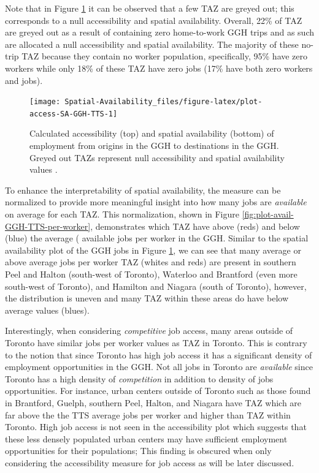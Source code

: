 \documentclass[]{elsarticle} %
\begin{document}
Note that in Figure \ref{fig:plot-access-SA-GGH-TTS} it can be observed
that a few TAZ are greyed out; this corresponds to a null accessibility
and spatial availability. Overall, 22\% of TAZ are greyed out as a
result of containing zero home-to-work GGH trips and as such are
allocated a null accessibility and spatial availability. The majority of
these no-trip TAZ because they contain no worker population,
specifically, 95\% have zero workers while only 18\% of these TAZ have
zero jobs (17\% have both zero workers and jobs).

\begin{figure}
\texttt{[image: Spatial-Availability\_files/figure-latex/plot-access-SA-GGH-TTS-1]} \caption{\label{fig:plot-access-SA-GGH-TTS}Calculated accessibility (top) and spatial availability (bottom) of employment from origins in the GGH to destinations in the GGH. Greyed out TAZs represent null accessibility and spatial availability values .}\label{fig:plot-access-SA-GGH-TTS}
\end{figure}

\newpage

To enhance the interpretability of spatial availability, the measure can
be normalized to provide more meaningful insight into how many jobs are
\emph{available} on average for each TAZ. This normalization, shown in
Figure \ref{fig:plot-avail-GGH-TTS-per-worker}, demonstrates which TAZ
have above (reds) and below (blue) the average ( available jobs per
worker in the GGH. Similar to the spatial availability plot of the GGH
jobs in Figure \ref{fig:plot-access-SA-GGH-TTS}, we can see that many
average or above average jobs per worker TAZ (whites and reds) are
present in southern Peel and Halton (south-west of Toronto), Waterloo
and Brantford (even more south-west of Toronto), and Hamilton and
Niagara (south of Toronto), however, the distribution is uneven and many
TAZ within these areas do have below average values (blues).

Interestingly, when considering \emph{competitive} job access, many
areas outside of Toronto have similar jobs per worker values as TAZ in
Toronto. This is contrary to the notion that since Toronto has high job
access it has a significant density of employment opportunities in the
GGH. Not all jobs in Toronto are \emph{available} since Toronto has a
high density of \emph{competition} in addition to density of jobs
opportunities. For instance, urban centers outside of Toronto such as
those found in Brantford, Guelph, southern Peel, Halton, and Niagara
have TAZ which are far above the the TTS average jobs per worker and
higher than TAZ within Toronto. High job access is not seen in the
accessibility plot which suggests that these less densely populated
urban centers may have sufficient employment opportunities for their
populations; This finding is obscured when only considering the
accessibility measure for job access as will be later discussed.
\end{document}
